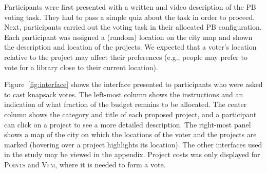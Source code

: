 \documentclass[runningheads]{llncs}
\newcommand{\points}{\textsc{Points}}
\newcommand{\vfm}{\textsc{Vfm}}
\begin{document}
 
Participants were first presented with a written and video description of the PB voting task. They had to pass a simple quiz about the task in order to proceed. 
Next, participants carried out the voting task 
in their allocated PB configuration.
Each participant was assigned a  (random) location on the city map and   shown the description and location of the projects. 
We expected that a voter's location relative to  the project may affect their   preferences (e.g., people may prefer to vote for a library  close to their current location). 
  



 




 Figure~\ref{fig:interface} shows the interface  presented to participants who were asked to cast knapsack votes. 
 The left-most column shows the instructions and an indication of what fraction of the budget remains to be allocated. The center column shows the category and title of each proposed project, and a participant can click on a project to see a more detailed description. The right-most panel shows a map of the city on which the locations of the voter and the projects are marked (hovering over a project highlights its location). The other interfaces used in the study may be viewed in the appendix. Project costs was only displayed for \points{} and \vfm{}, where it is needed to form a vote. %


\end{document}
